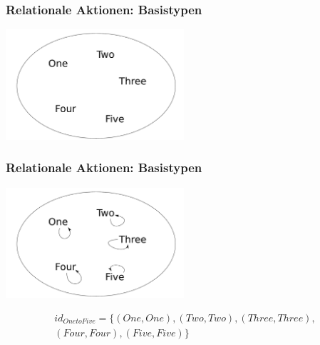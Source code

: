 \documentclass{beamer}
\begin{document}

\begin{frame}
\frametitle{Relationale Aktionen: Basistypen}

\begin{center}
\includegraphics[width=250px]{menge-onetofive}
\end{center}

\vspace{63.5px}

\end{frame}


\begin{frame}
\frametitle{Relationale Aktionen: Basistypen}

\begin{center}
\includegraphics[width=250px]{relation-onetofive}
\end{center}

\pause

\begin{align*}
id_{OnetoFive} = \{ (One, One), (Two, Two), (Three, Three),\\
(Four, Four), (Five, Five) \}
\end{align*}

\end{frame}

\end{document}
